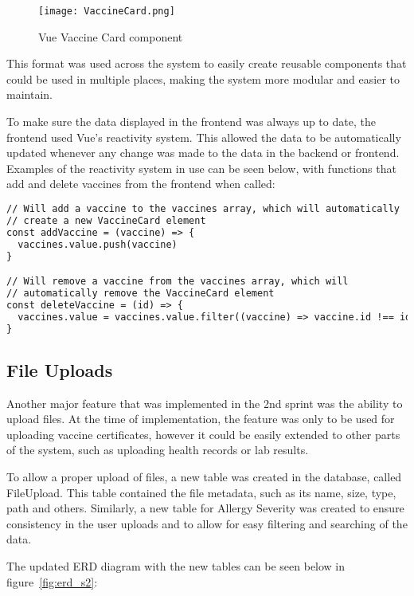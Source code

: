 \begin{figure}[htbp]
  \centering
  \texttt{[image: VaccineCard.png]}
  \caption{Vue Vaccine Card component}\label{fig:vaccinecard}
\end{figure}

\FloatBarrier{}

This format was used across the system to easily create reusable components that could be used in multiple places, making the system more modular and easier to maintain.

To make sure the data displayed in the frontend was always up to date, the frontend used Vue's reactivity system. This allowed the data to be automatically updated whenever any change was made to the data in the backend or frontend. Examples of the reactivity system in use can be seen below, with functions that add and delete vaccines from the frontend when called:


\begin{lstlisting}[language=HTML, caption=Vue Reactivity System]
// Will add a vaccine to the vaccines array, which will automatically 
// create a new VaccineCard element
const addVaccine = (vaccine) => {
  vaccines.value.push(vaccine)
}

// Will remove a vaccine from the vaccines array, which will 
// automatically remove the VaccineCard element
const deleteVaccine = (id) => {
  vaccines.value = vaccines.value.filter((vaccine) => vaccine.id !== id)
}
\end{lstlisting}

\subsection{File Uploads}

Another major feature that was implemented in the 2nd sprint was the ability to upload files. At the time of implementation, the feature was only to be used for uploading vaccine certificates, however it could be easily extended to other parts of the system, such as uploading health records or lab results.

To allow a proper upload of files, a new table was created in the database, called FileUpload. This table contained the file metadata, such as its name, size, type, path and others. Similarly, a new table for Allergy Severity was created to ensure consistency in the user uploads and to allow for easy filtering and searching of the data.

The updated ERD diagram with the new tables can be seen below in figure~\ref{fig:erd_s2}:

